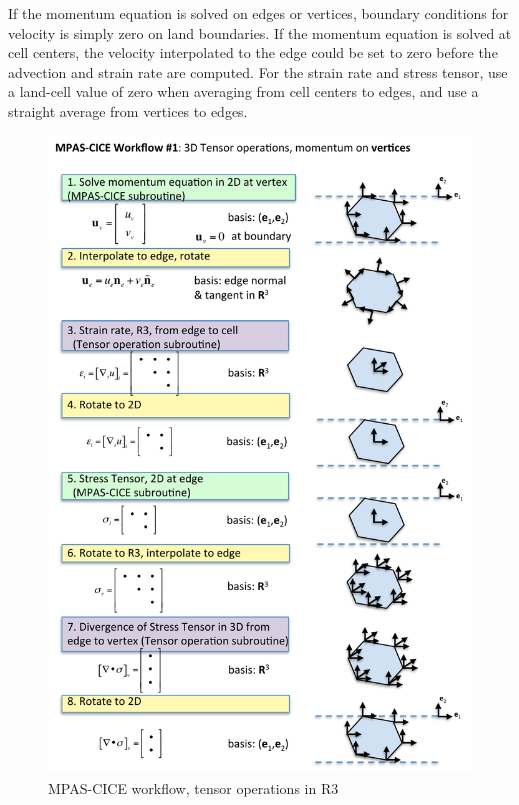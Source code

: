 \documentclass[11pt]{report}
\begin{document}
If the momentum equation is solved on edges or vertices, boundary conditions for velocity is simply zero on land boundaries.  If the momentum equation is solved at cell centers, the velocity interpolated to the edge could be set to zero before the advection and strain rate are computed.  For the strain rate and stress tensor, use a land-cell value of zero when averaging from cell centers to edges, and use a straight average from vertices to edges.

\begin{figure}[htbp]
 \center
 \includegraphics[scale=0.9]{f/mpasCICE_tensor_workflow1.pdf}
 \caption{MPAS-CICE workflow, tensor operations in R3}
 \label{fig:mpasCICE_tensor_workflow1}
\end{figure}
\end{document}
